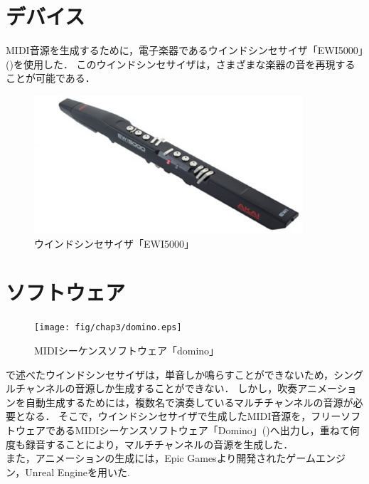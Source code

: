 \section{デバイス} \label{sec:device}
MIDI音源を生成するために，電子楽器であるウインドシンセサイザ「EWI5000」()を使用した．
このウインドシンセサイザは，さまざまな楽器の音を再現することが可能である．
\begin{figure}[h]
	\centering
	\includegraphics[width=10cm]{fig/chap3/ewi.eps}
	\caption{ウインドシンセサイザ「EWI5000」}
	\label{fig:ewi}
\end{figure}

\section{ソフトウェア} \label{sec:software}
\begin{figure}[h]
	\centering
	\texttt{[image: fig/chap3/domino.eps]}
	\caption{MIDIシーケンスソフトウェア「domino」}
	\label{fig:domino}
\end{figure}
で述べたウインドシンセサイザは，単音しか鳴らすことができないため，シングルチャンネルの音源しか生成することができない．
しかし，吹奏アニメーションを自動生成するためには，複数名で演奏しているマルチチャンネルの音源が必要となる．
そこで，ウインドシンセサイザで生成したMIDI音源を，フリーソフトウェアであるMIDIシーケンスソフトウェア「Domino」()\cite{domino}へ出力し，重ねて何度も録音することにより，マルチチャンネルの音源を生成した．\\
\indent
また，アニメーションの生成には，Epic Gamesより開発されたゲームエンジン，Unreal Engine\cite{ue4}を用いた.

